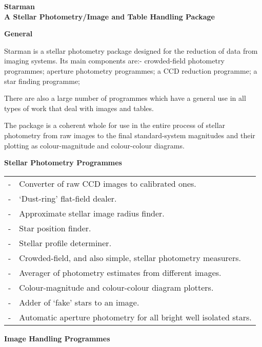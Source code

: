 \vspace{-1.5mm}
\begin{center}
{\LARGE \bf Starman } \\
{ \vspace*{2mm} \Large \bf A Stellar Photometry/Image and Table Handling Package }
\end{center}

{\vspace*{-2mm} \large \bf General \vspace*{-1mm} }


Starman is a stellar photometry package designed for the reduction of data
from imaging systems. Its main components are:- crowded-field photometry
programmes; aperture photometry programmes; a CCD reduction programme; a
star finding programme; 

There are also a large number of programmes which have a general use in all
types of work that deal with images and tables.

The package is a coherent whole for use in the entire process of stellar
photometry from raw images to the final standard-system magnitudes and
their plotting as colour-magnitude and colour-colour diagrams. 


{\vspace*{-1mm} \large \bf Stellar Photometry Programmes \vspace*{-1mm} }

\hspace*{3ex} \begin{tabular}{lp{5.5in}}
- & Converter of raw CCD images to calibrated ones. \\
- & `Dust-ring' flat-field dealer. \\
- & Approximate stellar image radius finder. \\
- & Star position finder. \\
- & Stellar profile determiner. \\
- & Crowded-field, and also simple, stellar photometry measurers. \\
- & Averager of photometry estimates from different images. \\
- & Colour-magnitude and colour-colour diagram plotters. \\ 
- & Adder of `fake' stars to an image. \\
- & Automatic aperture photometry for all bright well isolated stars. \\
\end{tabular}

{\vspace*{-1mm} \large \bf Image Handling Programmes \vspace*{-1mm} }

